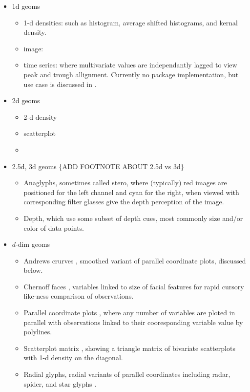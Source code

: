 \documentclass{monashthesis}
\begin{document}
\begin{itemize}
\tightlist
\item
  1d geoms

  \begin{itemize}
  \tightlist
  \item
    1-d densities: such as histogram, average shifted
    histograms\autocite{scott85}, and kernal density\autocite{scott95}.
  \item
    image: \autocite[ 2001]{Wegman}
  \item
    time series: where multivariate values are independantly lagged to
    view peak and trough allignment. Currently no package
    implementation, but use case is discussed in
    \autocite{cook_manual_1997}.
  \end{itemize}
\item
  2d geoms

  \begin{itemize}
  \item
    2-d density \autocite[ GITHUB]{NS}
  \item
    scatterplot
  \item
  \end{itemize}
\item
  2.5d, 3d geoms \{ADD FOOTNOTE ABOUT 2.5d vs 3d\}

  \begin{itemize}
  \tightlist
  \item
    Anaglyphs, sometimes called stero, where (typically) red images are
    positioned for the left channel and cyan for the right, when viewed
    with corresponding filter glasses give the depth perception of the
    image.
  \item
    Depth, which use some subset of depth cues, most commonly size
    and/or color of data points.
  \end{itemize}
\item
  \(d\)-dim geoms

  \begin{itemize}
  \tightlist
  \item
    Andrews crurves \autocite{andrews_plots_1972}, smoothed variant of
    parallel coordinate plots, discussed below.
  \item
    Chernoff faces \autocite{chernoff_use_1973}, variables linked to
    size of facial features for rapid cursory like-ness comparison of
    observations.
  \item
    Parallel coordinate plots \autocite{ocagne_coordonnees_1885}, where
    any number of variables are ploted in parallel with observations
    linked to their cooresponding variable value by polylines.
  \item
    Scatterplot matrix \autocite{becker_brushing_1987}, showing a
    triangle matrix of bivariate scatterplots with 1-d density on the
    diagonal.
  \item
    Radial glyphs, radial variants of parallel coordinates including
    radar, spider, and star glyphs \autocite{siegel_surgical_1972}.
  \end{itemize}
\end{itemize}
\end{document}
